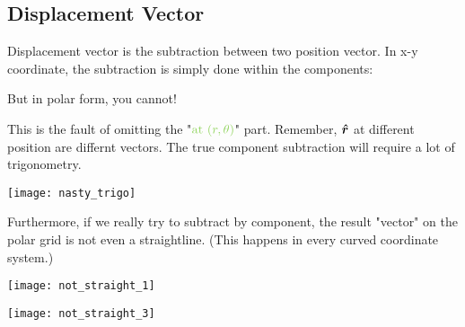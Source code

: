 \documentclass[class=article, crop=false, 12pt]{standalone}
\begin{document}
\subsection{Displacement Vector}

Displacement vector is the subtraction between two position vector. 
In x-y coordinate, the subtraction is simply done within the components:

But in polar form, you cannot!

This is the fault of omitting the "$\green{\text{at }(r,\theta)}$" part. 
Remember, $\vu*{r}$ at different position are differnt vectors. 
The true component subtraction will require a lot of trigonometry. 

\begin{center}
    \begin{minipage}{0.4\linewidth}
        \centering
    \end{minipage}
    \hspace{0.05\textwidth}
    \begin{minipage}{0.3\linewidth}
        \centering
        \texttt{[image: nasty\_trigo]}
    \end{minipage}
\end{center}


Furthermore, if we really try to subtract by component, 
the result "vector" on the polar grid is not even a straightline. 
(This happens in every curved coordinate system.)
\begin{center}
    \begin{minipage}{0.25\linewidth}
        \centering
        \texttt{[image: not\_straight\_1]}
    \end{minipage}
    \begin{minipage}{0.4\linewidth}
        \centering
    \end{minipage}
    \begin{minipage}{0.2\linewidth}
        \centering
        \texttt{[image: not\_straight\_3]}
    \end{minipage}
\end{center}
\end{document}
